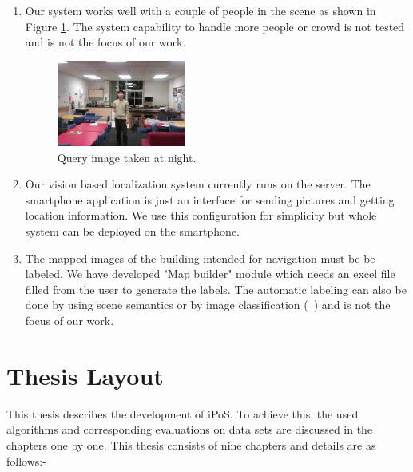 \begin{enumerate}
\item Our system works well with a couple of people in the scene 
as shown in Figure \ref{fig:crowd}. The system capability to 
handle more people or crowd is not 
tested and is not the focus of our work.
 
\begin{figure}[h!]
	\centering
                \includegraphics[width=0.4\textwidth]{images/crowd.png}
	      \caption{Query image taken at night.}
 \label{fig:crowd} 
\end{figure}


\item Our vision based localization system 
currently runs on the server. The smartphone 
application is just an interface for sending pictures 
and getting location information. We use 
this configuration for simplicity but 
whole system can be deployed on the smartphone. 



\item The mapped images of the building 
intended for navigation must be 
be labeled. We have developed "Map builder" 
module which needs an excel file filled from the user 
to generate the labels. The automatic labeling 
can also be done by using scene semantics 
or by image classification (~\cite{rasiwasia08, ranga10})
and is not the focus of our work.

\end{enumerate}

\section{Thesis Layout}
\label{sec:overview}

This thesis describes the development of iPoS. 
To achieve this, the used algorithms and corresponding evaluations 
on data sets are discussed in the chapters one by one. 
This thesis consists of nine chapters and details are 
as follows:-

